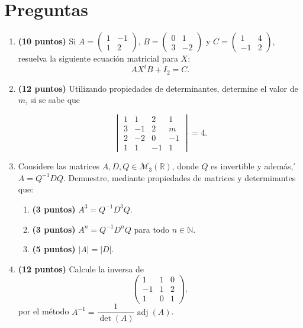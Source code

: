\documentclass[a4paper]{article}
\begin{document}
\section*{Preguntas}
\begin{enumerate}


\item {\bf (10 puntos)} Si $A=\begin{pmatrix} 1 & -1 \\ 1 & 2 \end{pmatrix}$, $B=\begin{pmatrix} 0 & 1 \\ 3 & -2 \end{pmatrix}$ y $C=\begin{pmatrix} 1 & 4 \\ -1 & 2 \end{pmatrix}$, resuelva la siguiente ecuación matricial para $X$:
    \[AX^tB+I_2=C.\]
    

    
\newpage

\newpage
\item {\bf (12 puntos)} Utilizando propiedades de determinantes, determine el valor de $m$, si se sabe que 

\[\begin{vmatrix} 1 & 1  & 2 & 1 \\ 3 & -1 & 2& m\\ 2 & -2 & 0& -1\\ 1 & 1 & -1 &  1  \end{vmatrix}=4. \]

   \newpage 
       \item  Considere las matrices $A,D,Q \in \mathcal{M}_3(\mathbb{R})$, donde $Q$ es invertible y además,  ́$ A = Q^{-1}DQ$. Demuestre, mediante propiedades de matrices y determinantes que:

\begin{enumerate}
    \item {\bf (3 puntos)} $A^3=Q^{-1}D^3Q$.
    \item {\bf (3 puntos)} $A^n=Q^{-1}D^nQ$ para todo $n\in \mathbb{N}$.
    \item {\bf (5 puntos)} $|A|=|D|$.
\end{enumerate}

\newpage
    \item {\bf (12 puntos)} Calcule la inversa de
\[\begin{pmatrix} 1 & 1  & 0  \\ -1 & 1 & 2\\ 1 & 0 & 1 \end{pmatrix}, \]
por el m\'etodo $A^{-1}=\dfrac{1}{\det(A)}\operatorname{adj}(A)$.
    \newpage
\newpage


\end{enumerate}
\end{document}
